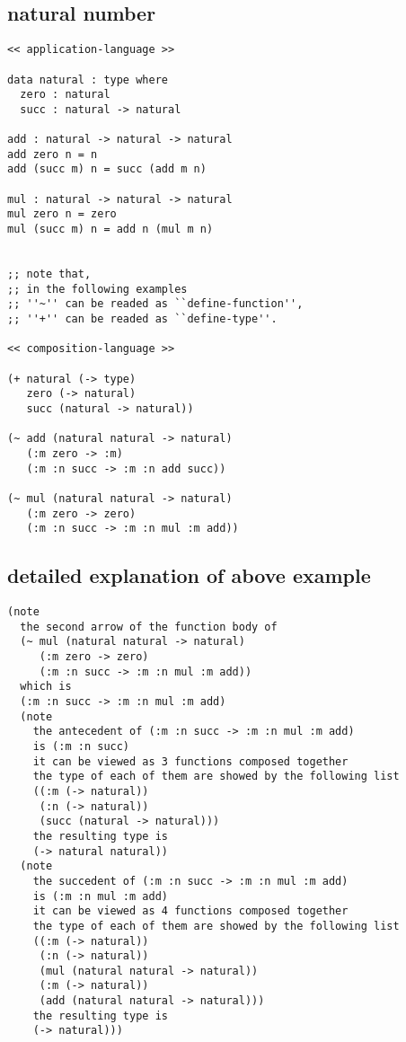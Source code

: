 \documentclass{sigplanconf}
\begin{document}
\subsection{natural number}

{\scriptsize\begin{verbatim}
<< application-language >>

data natural : type where
  zero : natural
  succ : natural -> natural

add : natural -> natural -> natural
add zero n = n
add (succ m) n = succ (add m n)

mul : natural -> natural -> natural
mul zero n = zero
mul (succ m) n = add n (mul m n)


;; note that,
;; in the following examples
;; ''~'' can be readed as ``define-function'',
;; ''+'' can be readed as ``define-type''.

<< composition-language >>

(+ natural (-> type)
   zero (-> natural)
   succ (natural -> natural))

(~ add (natural natural -> natural)
   (:m zero -> :m)
   (:m :n succ -> :m :n add succ))

(~ mul (natural natural -> natural)
   (:m zero -> zero)
   (:m :n succ -> :m :n mul :m add))
\end{verbatim}}

\subsection{detailed explanation of above example}

{\scriptsize\begin{verbatim}
(note
  the second arrow of the function body of
  (~ mul (natural natural -> natural)
     (:m zero -> zero)
     (:m :n succ -> :m :n mul :m add))
  which is
  (:m :n succ -> :m :n mul :m add)
  (note
    the antecedent of (:m :n succ -> :m :n mul :m add)
    is (:m :n succ)
    it can be viewed as 3 functions composed together
    the type of each of them are showed by the following list
    ((:m (-> natural))
     (:n (-> natural))
     (succ (natural -> natural)))
    the resulting type is
    (-> natural natural))
  (note
    the succedent of (:m :n succ -> :m :n mul :m add)
    is (:m :n mul :m add)
    it can be viewed as 4 functions composed together
    the type of each of them are showed by the following list
    ((:m (-> natural))
     (:n (-> natural))
     (mul (natural natural -> natural))
     (:m (-> natural))
     (add (natural natural -> natural)))
    the resulting type is
    (-> natural)))
\end{verbatim}}
\end{document}
